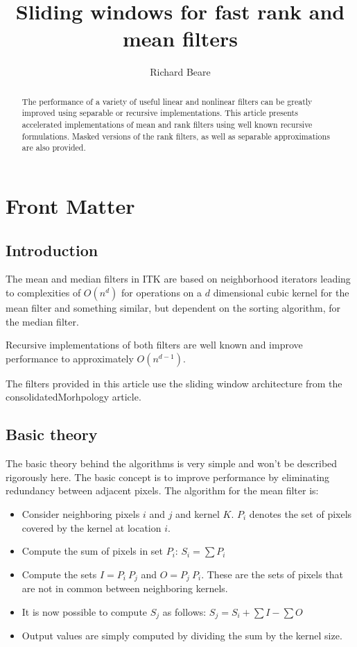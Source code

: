 \documentclass{InsightArticle}
\title{Sliding windows for fast rank and mean filters}
\author{Richard Beare}
\begin{document}
\maketitle

\ifhtml
\chapter*{Front Matter\label{front}}
\fi


\begin{abstract}
\noindent
The performance of a variety of useful linear and nonlinear filters
can be greatly improved using separable or recursive
implementations. This article presents accelerated implementations of
mean and rank filters using well known recursive formulations. Masked
versions of the rank filters, as well as separable approximations are
also provided.
\end{abstract}

\tableofcontents

\section{Introduction}
The mean and median filters in ITK are based on neighborhood iterators
leading to complexities of $O(n^d)$ for operations on a $d$
dimensional cubic kernel for the mean filter and something similar,
but dependent on the sorting algorithm, for the median filter. 

Recursive implementations of both filters are well known and improve
performance to approximately $O(n^{d-1})$.

The filters provided in this article use the sliding window
architecture from the consolidatedMorhpology article.

\section{Basic theory}
The basic theory behind the algorithms is very simple and won't be
described rigorously here. The basic concept is to improve performance
by eliminating redundancy between adjacent pixels. The algorithm for
the mean filter is:
\begin{itemize}
\item Consider neighboring pixels $i$ and $j$ and kernel $K$. $P_i$ 
      denotes the set of pixels covered by the kernel at location $i$.
\item Compute the sum of pixels in set $P_i$: $S_i = \sum P_i$
\item Compute the sets $I = P_i \ P_j$ and $O = P_j \ P_i$. These are 
      the sets of pixels that are not in common between neighboring kernels.
\item It is now possible to compute $S_j$ as follows: $S_j = S_i + \sum I - \sum O$
\item Output values are simply computed by dividing the sum by the kernel size.
\end{itemize}
\end{document}
